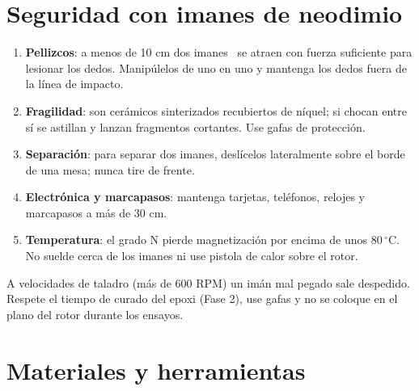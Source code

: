 \documentclass[11pt]{article}
\begin{document}
\section{Seguridad con imanes de neodimio}
\begin{advertencia}
\begin{enumerate}
  \item \textbf{Pellizcos}: a menos de 10 cm dos imanes \ValGradoIman\ se atraen con fuerza suficiente para
        lesionar los dedos. Manipúlelos de uno en uno y mantenga los dedos fuera de la línea de impacto.
  \item \textbf{Fragilidad}: son cerámicos sinterizados recubiertos de níquel; si chocan entre sí se astillan
        y lanzan fragmentos cortantes. Use gafas de protección.
  \item \textbf{Separación}: para separar dos imanes, deslícelos lateralmente sobre el borde de una mesa; nunca
        tire de frente.
  \item \textbf{Electrónica y marcapasos}: mantenga tarjetas, teléfonos, relojes y marcapasos a más de 30 cm.
  \item \textbf{Temperatura}: el grado N pierde magnetización por encima de unos 80\,$^\circ$C. No suelde cerca
        de los imanes ni use pistola de calor sobre el rotor.
\end{enumerate}
\end{advertencia}

\begin{advertencia}[Rotación]
A velocidades de taladro (más de 600 RPM) un imán mal pegado sale despedido. Respete el tiempo de curado del
epoxi (Fase 2), use gafas y no se coloque en el plano del rotor durante los ensayos.
\end{advertencia}

\section{Materiales y herramientas}
\end{document}
